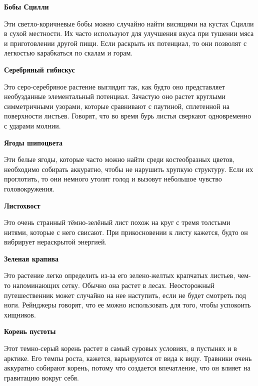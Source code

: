 \documentclass[a4paper, 9pt, twocolumn]{book}
\begin{document}
	\medspace
	
	\noindent \textbf{Бобы Сцилли}
	
	\noindent Эти светло-коричневые бобы можно случайно найти висящими на кустах Сцилли в сухой местности. Их часто используют для улучшения вкуса при тушении мяса и приготовлении другой пищи. Если раскрыть их потенциал, то они позволят с легкостью карабкаться по скалам и горам.
	
	\medspace
	
	\noindent \textbf{Серебряный гибискус}
	
	\smallskip
	
	\noindent Это серо-серебряное растение выглядит так, как будто оно представляет необузданные элементальный потенциал. Зачастую оно растет круглыми симметричными узорами, которые сравнивают с паутиной, сплетенной на поверхности листьев. Говорят, что во время бурь листья сверкают одновременно с ударами молнии.
	
	\medspace
	
	\noindent \textbf{Ягоды шипоцвета}
	
	\smallskip
	
	\noindent Эти белые ягоды, которые часто можно найти среди костеобразных цветов, необходимо собирать аккуратно, чтобы не нарушить хрупкую структуру. Если их проглотить, то они немного утолят голод и вызовут небольшое чувство головокружения.
	
	\medspace
	
	\noindent \textbf{Листохвост}
	
	\smallskip
	
	\noindent Это очень странный тёмно-зелёный лист похож на круг с тремя толстыми нитями, которые с него свисают. При прикосновении к листу кажется, будто он вибрирует нераскрытой энергией.
	
	\medspace
	
	\noindent \textbf{Зеленая крапива}
	
	\smallskip
	
	\noindent Это растение легко определить из-за его зелено-желтых крапчатых листьев, чем-то напоминающих сетку. Обычно она растет в лесах. Неосторожный путешественник может случайно на нее наступить, если не будет смотреть под ноги. Рейнджеры говорят, что ее можно использовать для того, чтобы успокоить хищников.
	
	\medspace
	
	\noindent \textbf{Корень пустоты}
	
	\smallskip
	
	\noindent Этот темно-серый корень растет в самый суровых условиях, в пустынях и в арктике. Его темпы роста, кажется, варьируются от вида к виду. Травники очень аккуратно собирают корень, потому что создается впечатление, что он влияет на гравитацию вокруг себя.
	
\end{document}
